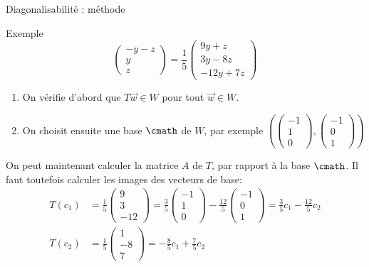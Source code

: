 \begin{parag}{Diagonalisabilité : méthode}
\begin{subparag}{Exemple}
\[\begin{pmatrix}
            -y -z \\ y \\ z
        \end{pmatrix} = \frac{1}{5}\begin{pmatrix}
            9y + z\\
            3y -8z \\
            -12 y + 7z
        \end{pmatrix}\]
        \begin{enumerate}
            \item On vérifie d'abord que $T\vec{w} \in W$ pour tout $\vec{w} \in W$.
            \item On choisit ensuite une base $\cmath$ de $W$, par exemple
            $\left(\begin{pmatrix}
                -1 \\ 1 \\ 0
            \end{pmatrix}, \begin{pmatrix}
                -1 \\0 \\ 1
            \end{pmatrix}\right)$
        \end{enumerate}
        On peut maintenant calculer la matrice $A$ de $T$, par rapport à la base $\cmath$. Il faut toutefois calculer les images des vecteurs de base:
        \begin{align*}
            T(c_1) &= \frac{1}{5}\begin{pmatrix}
                9 \\ 3 \\ -12
            \end{pmatrix} = \frac{3}{5}\begin{pmatrix}
                -1 \\ 1 \\ 0
            \end{pmatrix} - \frac{12}{5}\begin{pmatrix}
                -1 \\ 0 \\ 1
            \end{pmatrix} = \frac{3}{5}c_1 - \frac{12}{5}c_2\\
            T(c_2) &= \frac{1}{5}\begin{pmatrix}
                1 \\ -8 \\ 7
            \end{pmatrix} = -\frac{8}{5}c_1 + \frac{7}{5}c_2

\end{align*}
\end{subparag}
\end{parag}
